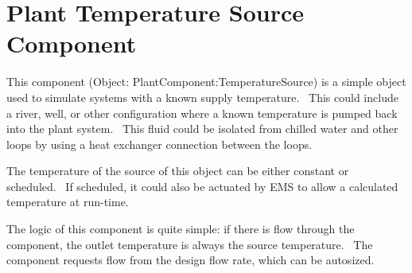 \section{Plant Temperature Source Component }\label{plant-temperature-source-component}

This component (Object: PlantComponent:TemperatureSource) is a simple object used to simulate systems with a known supply temperature.~ This could include a river, well, or other configuration where a known temperature is pumped back into the plant system.~ This fluid could be isolated from chilled water and other loops by using a heat exchanger connection between the loops.

The temperature of the source of this object can be either constant or scheduled.~ If scheduled, it could also be actuated by EMS to allow a calculated temperature at run-time.

The logic of this component is quite simple: if there is flow through the component, the outlet temperature is always the source temperature.~ The component requests flow from the design flow rate, which can be autosized.
